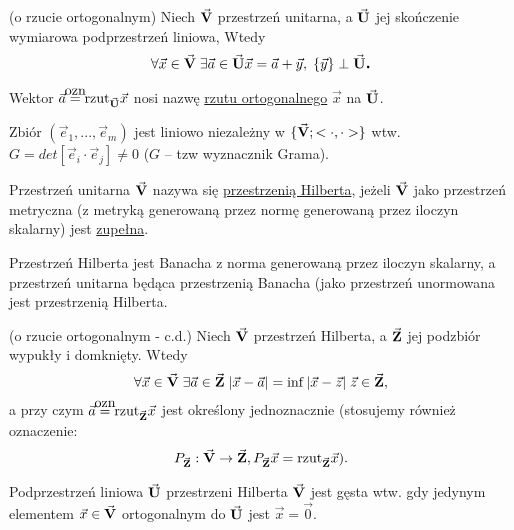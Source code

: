 \begin{tw}
   (o rzucie ortogonalnym) Niech $\vec{\mathbf{V}}$ przestrzeń unitarna, a $\vec{\mathbf{U}}$ jej skończenie wymiarowa podprzestrzeń liniowa, Wtedy
   \[\forall \vec{x} \in \vec{\mathbf{V}} \; \exists \vec{a} \in \vec{\mathbf{U}} \vec{x} = \vec{a} + \vec{y}, \; \{\vec{y}\} \perp \vec{\mathbf{U}} \mbox{\large\bfseries .}\]
   
   Wektor $\vec{a} \ozn \rzut_{\vset{U}}\vec{x}$ nosi nazwę \underline{rzutu ortogonalnego} $\vec{x}$ na $\vec{\mathbf{U}}$.
\end{tw}

\begin{tw}
   Zbiór $(\vec{e}_1, ..., \vec{e}_m)$ jest liniowo niezależny w $\{\vec{\mathbf{V}}; <\cdot, \cdot>\}$ wtw. $G = det[\vec{e}_i \cdot \vec{e}_j] \neq 0$ ($G$ -- tzw wyznacznik Grama).
\end{tw}

\begin{mydef} 
   Przestrzeń unitarna $\vec{\mathbf{V}}$ nazywa się \underline{przestrzenią Hilberta}, jeżeli $\vec{\mathbf{V}}$ jako przestrzeń metryczna (z metryką generowaną przez normę generowaną przez iloczyn skalarny) jest \underline{zupełna}.
\end{mydef}

\begin{info}
   Przestrzeń Hilberta jest Banacha z norma generowaną przez iloczyn skalarny, a przestrzeń unitarna będąca przestrzenią Banacha (jako przestrzeń unormowana jest przestrzenią Hilberta.
\end{info}

\begin{tw}
   (o rzucie ortogonalnym - c.d.) Niech $\vec{\mathbf{V}}$ przestrzeń Hilberta, a 
   $\vec{\mathbf{Z}}$ jej podzbiór wypukły i domknięty. Wtedy
   \[\forall \vec{x} \in \vec{\mathbf{V}} \; \exists \vec{a} \in \vec{\mathbf{Z}} \; |\vec{x} - \vec{a}| = \inf |\vec{x} - \vec{z}| \; \vec{z} \in \vec{\mathbf{Z}},\]
   a przy czym $\vec{a} \ozn \rzut_{\vset{Z}} \vec{x}$ jest określony jednoznacznie (stosujemy również oznaczenie:
   \[ P_{\vec{\mathbf{Z}}}: \vec{\mathbf{V}} \to \vec{\mathbf{Z}}, P_{\vec{\mathbf{Z}}} \vec{x} = \normalfont\mbox{rzut}_{\vec{\mathbf{Z}}} \vec{x} ).\]
\end{tw}

\begin{tw}
   Podprzestrzeń liniowa $\vec{\mathbf{U}}$ przestrzeni Hilberta $\vec{\mathbf{V}}$ jest gęsta wtw. gdy jedynym elementem $\vec{x} \in \vec{\mathbf{V}}$ ortogonalnym do $\vec{\mathbf{U}}$ jest $\vec{x} = \vec{0}$.
\end{tw}

